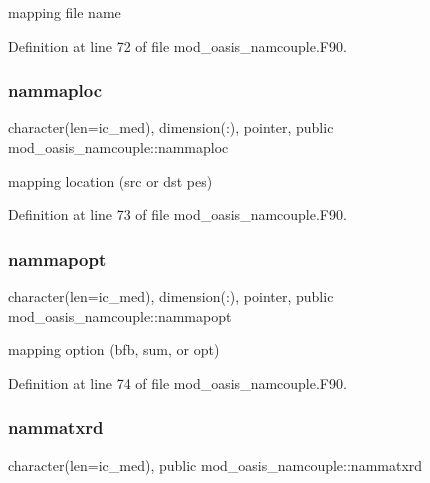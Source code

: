 mapping file name 



Definition at line 72 of file mod\+\_\+oasis\+\_\+namcouple.\+F90.

\mbox{\label{namespacemod__oasis__namcouple_a7316d7d322da7cf10f315e38c145ebbb}} 
\subsubsection{\texorpdfstring{nammaploc}{nammaploc}}
{\footnotesize\ttfamily character(len=ic\+\_\+med), dimension(\+:), pointer, public mod\+\_\+oasis\+\_\+namcouple\+::nammaploc}



mapping location (src or dst pes) 



Definition at line 73 of file mod\+\_\+oasis\+\_\+namcouple.\+F90.

\mbox{\label{namespacemod__oasis__namcouple_ad2554b4881fa63780dd5e6fe78d705ef}} 
\subsubsection{\texorpdfstring{nammapopt}{nammapopt}}
{\footnotesize\ttfamily character(len=ic\+\_\+med), dimension(\+:), pointer, public mod\+\_\+oasis\+\_\+namcouple\+::nammapopt}



mapping option (bfb, sum, or opt) 



Definition at line 74 of file mod\+\_\+oasis\+\_\+namcouple.\+F90.

\mbox{\label{namespacemod__oasis__namcouple_ad9ac6585de157a05d793636addf672a5}} 
\subsubsection{\texorpdfstring{nammatxrd}{nammatxrd}}
{\footnotesize\ttfamily character(len=ic\+\_\+med), public mod\+\_\+oasis\+\_\+namcouple\+::nammatxrd}




